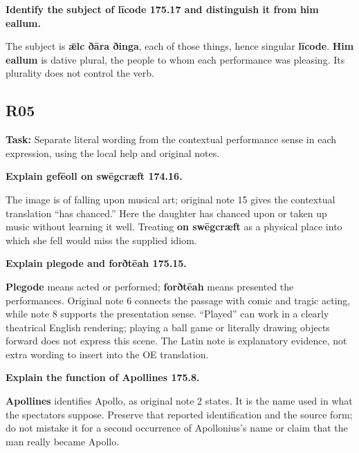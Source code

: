 \textbf{Identify the subject of līcode 175.17 and distinguish it from him eallum.}

The subject is \textbf{ǣlc ðāra ðinga}, each of those things, hence singular \textbf{līcode}. \textbf{Him eallum} is dative plural, the people to whom each performance was pleasing. Its plurality does not control the verb.

\subsection*{R05}

\textbf{Task:} Separate literal wording from the contextual performance sense in each expression, using the local help and original notes.

\textbf{Explain gefēoll on swēgcræft 174.16.}

The image is of falling upon musical art; original note 15 gives the contextual translation “has chanced.” Here the daughter has chanced upon or taken up music without learning it well. Treating \textbf{on swēgcræft} as a physical place into which she fell would miss the supplied idiom.

\textbf{Explain plegode and forðtēah 175.15.}

\textbf{Plegode} means acted or performed; \textbf{forðtēah} means presented the performances. Original note 6 connects the passage with comic and tragic acting, while note 8 supports the presentation sense. “Played” can work in a clearly theatrical English rendering; playing a ball game or literally drawing objects forward does not express this scene. The Latin note is explanatory evidence, not extra wording to insert into the OE translation.

\textbf{Explain the function of Apollines 175.8.}

\textbf{Apollines} identifies Apollo, as original note 2 states. It is the name used in what the spectators suppose. Preserve that reported identification and the source form; do not mistake it for a second occurrence of Apollonius's name or claim that the man really became Apollo.

